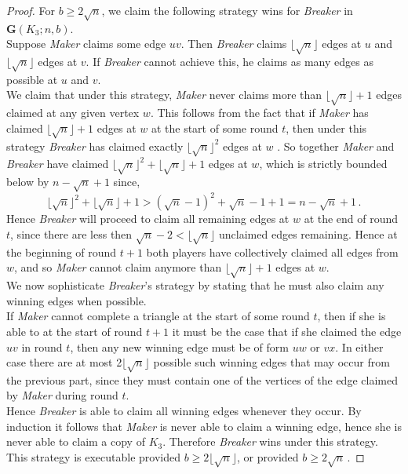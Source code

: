 \documentclass[a4paper,oneside,11pt]{report}
\begin{document}
\begin{proof}
For $b \geqslant 2\sqrt{n}$, we claim the following strategy wins for \textit{Breaker} in $\textbf{G}(K_3;n,b)$.\\ 

Suppose \textit{Maker} claims some edge $uv$. Then \textit{Breaker} claims $ \lfloor \sqrt{n} \rfloor $ edges at $u$ and $ \lfloor \sqrt{n} \rfloor $ edges at $v$. If \textit{Breaker} cannot achieve this, he claims as many edges as possible at $u$ and $v$.\\

We claim that under this strategy, \textit{Maker} never claims more than $ \lfloor \sqrt{n} \rfloor + 1 $ edges claimed at any given vertex $w$. This follows from the fact that if \textit{Maker} has claimed $ \lfloor \sqrt{n} \rfloor +1 $ edges at $w$ at the start of some round $t$, then under this strategy \textit{Breaker} has claimed exactly $ \lfloor \sqrt{n} \rfloor^2$ edges at $w$ . So together \textit{Maker} and \textit{Breaker} have claimed  $ \lfloor \sqrt{n} \rfloor^2+\lfloor \sqrt{n} \rfloor +1 $ edges at $w$, which is strictly bounded below by $n-\sqrt{n}+1$ since, \[\lfloor \sqrt{n} \rfloor^2+\lfloor \sqrt{n} \rfloor +1>(\sqrt{n}-1)^2+\sqrt{n}-1+1=n-\sqrt{n}+1  \, .\] Hence \textit{Breaker} will proceed to claim all remaining edges at $w$ at the end of round $t$, since there are less then $\sqrt{n}-2 < \lfloor \sqrt{n} \rfloor$ unclaimed edges remaining. Hence at the beginning of round $t+1$ both players have collectively claimed all edges from $w$, and so \textit{Maker} cannot claim anymore than $ \lfloor \sqrt{n} \rfloor + 1 $ edges at $w$.\\

We now sophisticate \textit{Breaker}'s strategy by stating that he must also claim any winning edges when possible.\\

If \textit{Maker} cannot complete a triangle at the start of some round $t$, then if she is able to at the start of round $t+1$ it must be the case that if she claimed the edge $uv$ in round $t$, then any new winning edge must be of form $uw$ or $vx$. In either case there are at most  2$ \lfloor \sqrt{n} \rfloor $ possible such winning edges that may occur from the previous part, since they must contain one of the vertices of the edge claimed by \textit{Maker} during round $t$.\\

Hence \textit{Breaker} is able to claim all winning edges whenever they occur. By induction it follows that \textit{Maker} is never able to claim a winning edge, hence she is never able to claim a copy of $K_3$. Therefore \textit{Breaker} wins under this strategy. This strategy is executable provided $b \geqslant 2\lfloor \sqrt{n} \rfloor$, or provided $b \geqslant 2\sqrt{n}\,.$

\end{proof}
\end{document}
